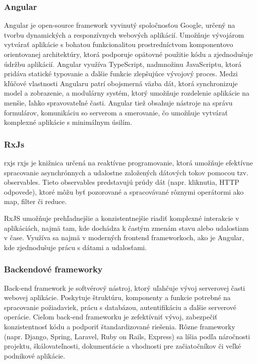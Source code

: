 \subsubsection{Angular}
Angular je open-source framework vyvinutý spoločnosťou Google, určený na tvorbu dynamických a responzívnych webových aplikácií.
Umožňuje vývojárom vytvárať aplikácie s bohatou funkcionalitou prostredníctvom komponentovo orientovanej architektúry, ktorá podporuje opätovné použitie kódu a zjednodušuje údržbu aplikácií.
Angular využíva TypeScript, nadmnožinu JavaScriptu, ktorá pridáva statické typovanie a ďalšie funkcie zlepšujúce vývojový proces. 
Medzi kľúčové vlastnosti Angularu patrí obojsmerná väzba dát, ktorá synchronizuje model a zobrazenie, a modulárny systém, ktorý umožňuje rozdelenie aplikácie na menšie, ľahko spravovateľné časti.
Angular tiež obsahuje nástroje na správu formulárov, komunikáciu so serverom a smerovanie, čo umožňuje vytvárať komplexné aplikácie s minimálnym úsilím. \cite{angular}

\subsubsection{RxJs}
\acrshort{rxjs} \acrfull{rxjs} je knižnica určená na reaktívne programovanie, ktorá umožňuje efektívne spracovanie asynchrónnych a udalostne založených dátových tokov pomocou tzv. observables. 
Tieto observables predstavujú prúdy dát (napr. kliknutia, HTTP odpovede), ktoré môžu byť pozorované a spracovávané rôznymi operátormi ako map, filter či reduce.

RxJS umožňuje prehľadnejšie a konzistentnejšie riadiť komplexné interakcie v aplikáciách, najmä tam, kde dochádza k častým zmenám stavu alebo udalostiam v čase.
Využíva sa najmä v moderných frontend frameworkoch, ako je Angular, kde zjednodušuje prácu s dátami a udalosťami.\cite{rxjs}
\subsubsection{Backendové frameworky}
Back-end framework je softvérový nástroj, ktorý uľahčuje vývoj serverovej časti webovej aplikácie. 
Poskytuje štruktúru, komponenty a funkcie potrebné na spracovanie požiadaviek, prácu s databázou, autentifikáciu a ďalšie serverové operácie. 
Cieľom back-end frameworku je zefektívniť vývoj, zabezpečiť konzistentnosť kódu a podporiť štandardizované riešenia. 
Rôzne frameworky (napr. Django, Spring, Laravel, Ruby on Rails, Express) sa líšia podľa náročnosti projektu, škálovateľnosti, dokumentácie a vhodnosti pre začiatočníkov či veľké podnikové aplikácie.\cite{backendframework}

